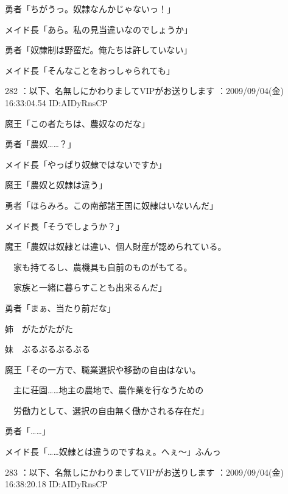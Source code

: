 \documentclass[a4j,twocolumn]{tarticle}
\begin{document}
勇者「ちがうっ。奴隷なんかじゃないっ！」 



メイド長「あら。私の見当違いなのでしょうか」 



勇者「奴隷制は野蛮だ。俺たちは許していない」 



メイド長「そんなことをおっしゃられても」 

	
    
    

282 ：以下、名無しにかわりましてVIPがお送りします ：2009/09/04(金) 16:33:04.54 ID:AIDyRnsCP 


魔王「この者たちは、農奴なのだな」\par{} 
勇者「農奴……？」 



メイド長「やっぱり奴隷ではないですか」 



魔王「農奴と奴隷は違う」\par{} 
勇者「ほらみろ。この南部諸王国に奴隷はいないんだ」 



メイド長「そうでしょうか？」 



魔王「農奴は奴隷とは違い、個人財産が認められている。\par{} 
　家も持てるし、農機具も自前のものがもてる。\par{} 
　家族と一緒に暮らすことも出来るんだ」 



勇者「まぁ、当たり前だな」 



姉　がたがたがた\par{} 
妹　ぶるぶるぶるぶる 



魔王「その一方で、職業選択や移動の自由はない。\par{} 
　主に荘園……地主の農地で、農作業を行なうための\par{} 
　労働力として、選択の自由無く働かされる存在だ」 



勇者「……」\par{} 
メイド長「……奴隷とは違うのですねぇ。へぇ～」ふんっ

	
    
    

283 ：以下、名無しにかわりましてVIPがお送りします ：2009/09/04(金) 16:38:20.18 ID:AIDyRnsCP 
\end{document}
